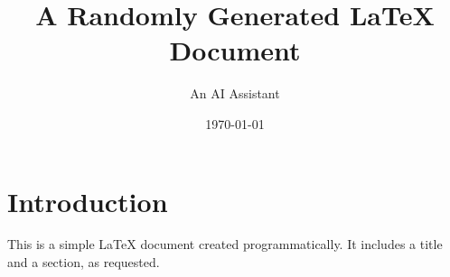 \documentclass{article}
\title{A Randomly Generated LaTeX Document}
\author{An AI Assistant}
\date{\today}
\begin{document}
\maketitle

\section{Introduction}
This is a simple LaTeX document created programmatically. It includes a title and a section, as requested.
\end{document}
